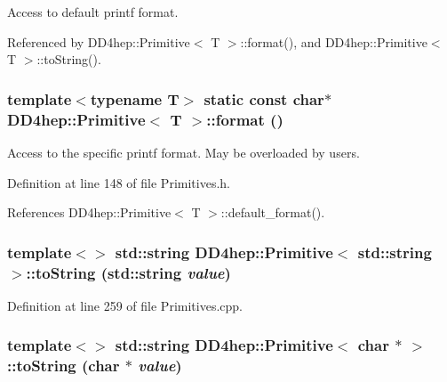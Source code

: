 Access to default printf format. 

Referenced by DD4hep::Primitive$<$ T $>$::format(), and DD4hep::Primitive$<$ T $>$::toString().\hypertarget{struct_d_d4hep_1_1_primitive_ae24ddbca63bd0cac596c39c519d134f8}{
\subsubsection[{format}]{\setlength{\rightskip}{0pt plus 5cm}template$<$typename T$>$ static const char$\ast$ {\bf DD4hep::Primitive}$<$ {\bf T} $>$::format ()}}
\label{struct_d_d4hep_1_1_primitive_ae24ddbca63bd0cac596c39c519d134f8}


Access to the specific printf format. May be overloaded by users. 

Definition at line 148 of file Primitives.h.

References DD4hep::Primitive$<$ T $>$::default\_\-format().\hypertarget{struct_d_d4hep_1_1_primitive_aa15bf6fc96f8a4673ecea28479fcf38d}{
\subsubsection[{toString}]{\setlength{\rightskip}{0pt plus 5cm}template$<$$>$ std::string {\bf DD4hep::Primitive}$<$ std::string $>$::toString (std::string {\em value})}}
\label{struct_d_d4hep_1_1_primitive_aa15bf6fc96f8a4673ecea28479fcf38d}


Definition at line 259 of file Primitives.cpp.\hypertarget{struct_d_d4hep_1_1_primitive_abcc89d7824eaf764777b38330a727497}{
\subsubsection[{toString}]{\setlength{\rightskip}{0pt plus 5cm}template$<$$>$ std::string {\bf DD4hep::Primitive}$<$ char $\ast$ $>$::toString (char $\ast$ {\em value})}}
\label{struct_d_d4hep_1_1_primitive_abcc89d7824eaf764777b38330a727497}


